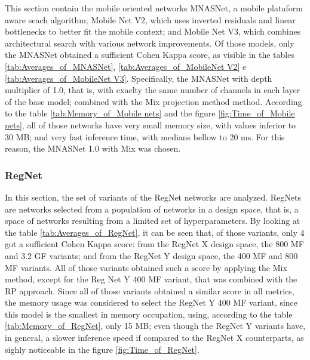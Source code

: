 




\pagebreak

This section contain the mobile oriented networks MNASNet, a mobile plataform aware seach algorithm; Mobile Net V2, which uses inverted residuals and linear bottlenecks to better fit the mobile context; and Mobile Net V3, which combines architectural search with various network improvements. Of those models, only the MNASNet obtained a sufficient Cohen Kappa score, as visible in the tables \ref{tab:Averages_of_MNASNet}, \ref{tab:Averages_of_MobileNet V2} e \ref{tab:Averages_of_MobileNet V3}. Specifically, the MNASNet with depth multiplier of 1.0, that is, with exaclty the same number of channels in each layer of the base model; combined with the \acrshort{Mix} projection method method. According to the table \ref{tab:Memory_of_Mobile nets} and the figure \ref{fig:Time_of_Mobile nets}, all of those networks have very small memory size, with values inferior to 30 MB; and very fast inference time, with medians bellow to 20 ms. For this reason, the MNASNet 1.0 with \acrshort{Mix} was chosen. 

\pagebreak

\subsubsection{RegNet}






In this section, the set of variants of the RegNet networks are analyzed. RegNets are networks selected from a population of networks in a design space, that is, a space of networks resulting from a limited set of hyperparameters. By looking at the table \ref{tab:Averages_of_RegNet}, it can be seen that, of those variants, only 4 got a sufficient Cohen Kappa score: from the RegNet X design space, the 800 MF and 3.2 GF variants; and from the RegNet Y design space, the 400 MF and 800 MF variants. All of those variants obtained such a score by applying the \acrshort{Mix} method, except for the Reg Net Y 400 MF variant, that was combined with the \acrshort{RP} approach. Since all of those variants obtained a similar score in all metrics, the memory usage was considered to select the RegNet Y 400 MF variant, since this model is the smallest in memory occupation, using, according to the table \ref{tab:Memory_of_RegNet}, only 15 MB; even though the RegNet Y variants have, in general, a slower inference speed if compared to the RegNet X counterparts, as sighly noticeable in the figure \ref{fig:Time_of_RegNet}.

